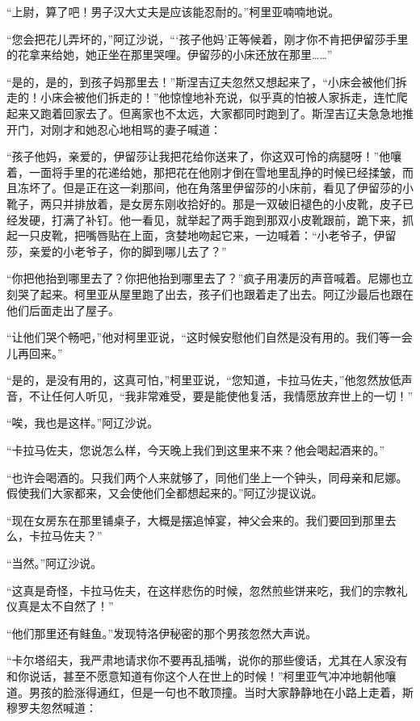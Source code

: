 \par “上尉，算了吧！男子汉大丈夫是应该能忍耐的。”柯里亚喃喃地说。
\par “您会把花儿弄坏的，”阿辽沙说，“‘孩子他妈’正等候着，刚才你不肯把伊留莎手里的花拿来给她，她正坐在那里哭哩。伊留莎的小床还放在那里……”
\par “是的，是的，到孩子妈那里去！”斯涅吉辽夫忽然又想起来了，“小床会被他们拆走的！小床会被他们拆走的！”他惊惶地补充说，似乎真的怕被人家拆走，连忙爬起来又跑着回家去了。但离家也不太远，大家都同时跑到了。斯涅吉辽夫急急地推开门，对刚才和她忍心地相骂的妻子喊道：
\par “孩子他妈，亲爱的，伊留莎让我把花给你送来了，你这双可怜的病腿呀！”他嚷着，一面将手里的花递给她，那把花在他刚才倒在雪地里乱挣的时候已经揉皱，而且冻坏了。但是正在这一刹那间，他在角落里伊留莎的小床前，看见了伊留莎的小靴子，两只并排放着，是女房东刚收拾好的。那是一双破旧褪色的小皮靴，皮子已经发硬，打满了补钉。他一看见，就举起了两手跑到那双小皮靴跟前，跪下来，抓起一只皮靴，把嘴唇贴在上面，贪婪地吻起它来，一边喊着：“小老爷子，伊留莎，亲爱的小老爷子，你的脚到哪儿去了？”
\par “你把他抬到哪里去了？你把他抬到哪里去了？”疯子用凄厉的声音喊着。尼娜也立刻哭了起来。柯里亚从屋里跑了出去，孩子们也跟着走了出去。阿辽沙最后也跟在他们后面走出了屋子。
\par “让他们哭个畅吧，”他对柯里亚说，“这时候安慰他们自然是没有用的。我们等一会儿再回来。”
\par “是的，是没有用的，这真可怕，”柯里亚说，“您知道，卡拉马佐夫，”他忽然放低声音，不让任何人听见，“我非常难受，要是能使他复活，我情愿放弃世上的一切！”
\par “唉，我也是这样。”阿辽沙说。
\par “卡拉马佐夫，您说怎么样，今天晚上我们到这里来不来？他会喝起酒来的。”
\par “也许会喝酒的。只我们两个人来就够了，同他们坐上一个钟头，同母亲和尼娜。假使我们大家都来，又会使他们全都想起来的。”阿辽沙提议说。
\par “现在女房东在那里铺桌子，大概是摆追悼宴，神父会来的。我们要回到那里去么，卡拉马佐夫？”
\par “当然。”阿辽沙说。
\par “这真是奇怪，卡拉马佐夫，在这样悲伤的时候，忽然煎些饼来吃，我们的宗教礼仪真是太不自然了！”
\par “他们那里还有鲑鱼。”发现特洛伊秘密的那个男孩忽然大声说。
\par “卡尔塔绍夫，我严肃地请求你不要再乱插嘴，说你的那些傻话，尤其在人家没有和你说话，甚至不愿意知道有你这个人在世上的时候！”柯里亚气冲冲地朝他嚷道。男孩的脸涨得通红，但是一句也不敢顶撞。当时大家静静地在小路上走着，斯穆罗夫忽然喊道：
